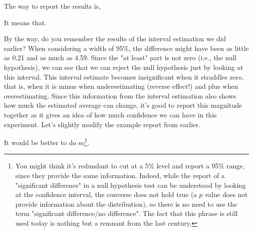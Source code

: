 \documentclass{ltjsbook}
\begin{document}
The way to report the results is,

It means that.

By the way, do you remember the results of the interval estimation we did earlier? When considering a width of 95\%, the difference might have been as little as 0.21 and as much as 4.59. Since the "at least" part is not zero (i.e., the null hypothesis), we can see that we can reject the null hypothesis just by looking at this interval. This interval estimate becomes insignificant when it straddles zero, that is, when it is minus when underestimating (reverse effect!) and plus when overestimating. Since this information from the interval estimation also shows how much the estimated average can change, it's good to report this magnitude together as it gives an idea of how much confidence we can have in this experiment. Let's slightly modify the example report from earlier.



It would be better to do so\footnote{You might think it's redundant to cut at a 5\% level and report a 95\% range, since they provide the same information. Indeed, while the report of a "significant difference" in a null hypothesis test can be understood by looking at the confidence interval, the converse does not hold true (a $p$ value does not provide information about the distribution), so there is no need to use the term "significant difference/no difference". The fact that this phrase is still used today is nothing but a remnant from the last century.}.
\end{document}
